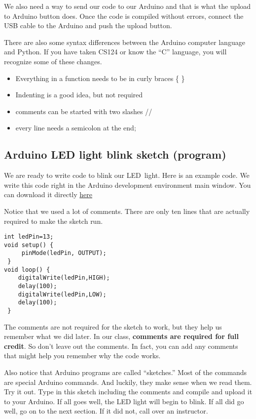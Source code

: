 We also need a way to send our code to our Arduino and that is what the upload to Arduino button does. Once the code is compiled without errors, connect the USB cable to the Arduino and push the upload button.

There are also some syntax differences between the Arduino computer language and Python. If you have taken CS124 or know the ``C'' language, you will recognize some of these changes.

\begin{itemize}
	\item Everything in a function needs to be in curly braces \{ \}
	\item Indenting is a good idea, but not required
	\item comments can be started with two slashes //
	\item every line needs a semicolon at the end;
\end{itemize}

\subsection{Arduino LED light blink sketch (program)}

We are ready to write code to blink our LED\ light. Here is an example code. We write this code right in the Arduino development environment main window. You can download it directly \href{https://github.com/rtlines/IntermediateLabPH250/blob/main/Code/IntroBlink.ino}{here}




Notice that we used a lot of comments. There are only ten lines that are
actually required to make the sketch run.

\begin{lstlisting}[language=Arduino] 
int ledPin=13;
void setup() {
	 pinMode(ledPin, OUTPUT);
 }
void loop() {
	digitalWrite(ledPin,HIGH);
	delay(100);
	digitalWrite(ledPin,LOW);
	delay(100);
 }
\end{lstlisting}

The comments are not required for the sketch to work, but they help us remember what we did later. In our class, \textbf{comments are required for full credit}. So don't leave out the comments. In fact, you can add any comments that might help you remember why the code works.

Also notice that Arduino programs are called ``sketches.'' Most of the commands are special Arduino commands. And luckily, they make sense when we read them. Try it out. Type in this sketch including the comments and compile and upload it to your Arduino. If all goes well, the LED light will begin to blink. If all did go well, go on to the next section. If it did not, call over an instructor. 

